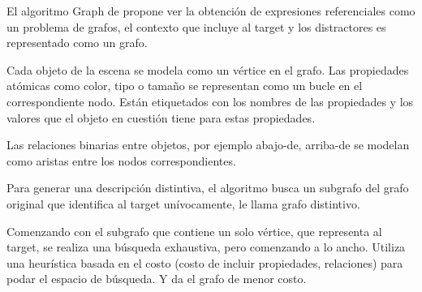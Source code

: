 El algoritmo Graph de \cite{Krahmer:2003} propone ver la obtenci\'on de expresiones referenciales como un problema de grafos, el contexto que incluye al target y los distractores es representado como un grafo. 

Cada objeto de la escena se modela como un v\'ertice en el grafo. Las propiedades at\'omicas como color, tipo o tama\~no se representan como un bucle en el correspondiente nodo. Est\'an etiquetados con los nombres de las propiedades y los valores que el objeto en cuesti\'on tiene para estas propiedades. 

Las relaciones binarias entre objetos, por ejemplo abajo-de, arriba-de se modelan como aristas entre los nodos correspondientes.



Para generar una descripci\'on distintiva, el algoritmo busca un subgrafo del grafo original que identifica al target un\'{i}vocamente, le llama grafo distintivo.%

Comenzando con el subgrafo que contiene un solo v\'ertice, que representa al target, se realiza una b\'usqueda exhaustiva, pero comenzando a lo ancho. Utiliza una heur\'{i}stica basada en el costo (costo de incluir propiedades, relaciones) para podar el espacio de b\'usqueda. Y da el grafo de menor costo. 



